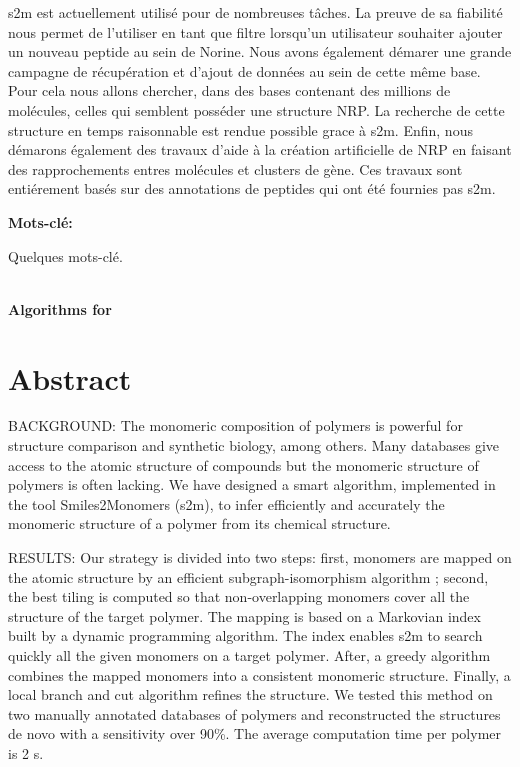 \documentclass[12pt]{LHSV_thesis}
\begin{document}
s2m est actuellement utilisé pour de nombreuses tâches.
La preuve de sa fiabilité nous permet de l'utiliser en tant que filtre lorsqu'un utilisateur souhaiter ajouter un nouveau peptide au sein de Norine.
Nous avons également démarer une grande campagne de récupération et d'ajout de données au sein de cette même base.
Pour cela nous allons chercher, dans des bases contenant des millions de molécules, celles qui semblent posséder une structure NRP.
La recherche de cette structure en temps raisonnable est rendue possible grace à s2m.
Enfin, nous démarons également des travaux d'aide à la création artificielle de NRP en faisant des rapprochements entres molécules et clusters de gène.
Ces travaux sont entiérement basés sur des annotations de peptides qui ont été fournies pas s2m.


\vspace*{28pt}\par
\textbf{Mots-clé:}\par
Quelques mots-clé.
\par
\clearpage

\begin{center}
~\vspace{6.0cm}\\
\thispagestyle{plain}
\Huge \textbf{Algorithms for }
\vspace*{\fill}
\clearpage
\end{center}

\section*{\Huge Abstract}
%
\vspace{2cm}


BACKGROUND: The monomeric composition of polymers is powerful for structure comparison and synthetic biology, among others.
Many databases give access to the atomic structure of compounds but the monomeric structure of polymers is often lacking.
We have designed a smart algorithm, implemented in the tool Smiles2Monomers (s2m), to infer efficiently and accurately the monomeric structure of a polymer from its chemical structure.

RESULTS: Our strategy is divided into two steps: first, monomers are mapped on the atomic structure by an efficient subgraph-isomorphism algorithm ; second, the best tiling is computed so that non-overlapping monomers cover all the structure of the target polymer.
The mapping is based on a Markovian index built by a dynamic programming algorithm.
The index enables s2m to search quickly all the given monomers on a target polymer.
After, a greedy algorithm combines the mapped monomers into a consistent monomeric structure.
Finally, a local branch and cut algorithm refines the structure.
We tested this method on two manually annotated databases of polymers and reconstructed the structures de novo with a sensitivity over 90\%.
The average computation time per polymer is 2 s.
\end{document}

